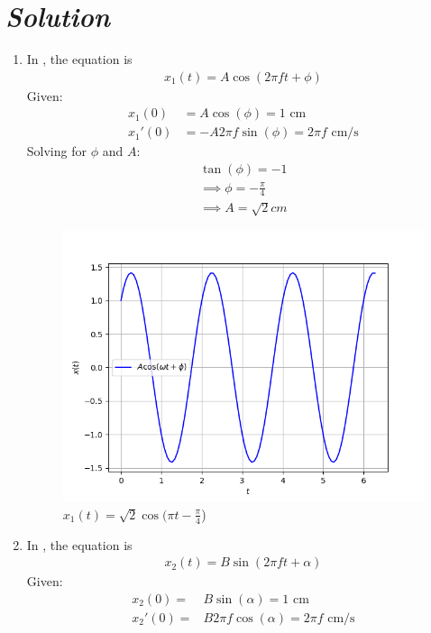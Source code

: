 \documentclass[journal,12pt,twocolumn]{IEEEtran}
\theoremstyle{remark}
\begin{document}
\section*{\textit{\textbf{Solution}}}

\begin{enumerate}
\item In , the equation is
\begin{align}
   x_1(t) = A \cos(2\pi f t + \phi)  
\end{align}
Given:
\begin{align}
     x_1(0)&= A \cos(\phi) = 1 \text{ cm} \\
 x_1'(0)&= -A 2\pi f \sin(\phi) = 2\pi f \text{ cm/s} \label{eq:3}
 \end{align}
Solving for $\phi$ and $A$:
\begin{align}
    \tan(\phi) = -1\\
\implies
\phi = -\frac{\pi}{4} \\
\implies 
A= \sqrt{2}cm
\end{align}
\begin{figure}[h]
\renewcommand\thefigure{1}
    \centering
    \includegraphics[width=0.8\columnwidth]{figs/fig1.png}
    \caption{$x_1(t) = \sqrt{2}\cos(\pi t - \frac{\pi}{4}$)}
    \label{Fig1_11.14.7}
\end{figure}
    \item In , the equation is
\begin{align}
    x_2(t) = B \sin(2\pi f t + \alpha) 
    \end{align}
    Given:\\
    \begin{align}
     x_2(0)=& B \sin(\alpha) = 1 \text{ cm} \\
    x_2'(0)=& B 2\pi f \cos(\alpha) = 2\pi f \text{ cm/s}\label{eq;11}

\end{align}
\end{enumerate}
\end{document}
